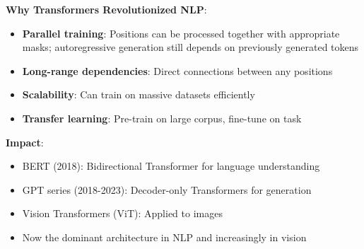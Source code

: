 \documentclass[11pt,twoside]{article}
\numberwithin{equation}{section}
\theoremstyle{plain}
\theoremstyle{definition}
\theoremstyle{remark}
\newenvironment{keyidea}{
  \begin{tcolorbox}[colback=yellow!5!white,
                    colframe=yellow!50!black,
                    title=Key Idea,
                    breakable,
                    enhanced,
                    sharp corners,
                    boxrule=0.8pt,
                    left=6pt, right=6pt, top=6pt, bottom=6pt]
}{
  \end{tcolorbox}
}
\begin{document}
\begin{keyidea}
\textbf{Why Transformers Revolutionized NLP}:
\begin{itemize}
\item \textbf{Parallel training}: Positions can be processed together with appropriate masks; autoregressive generation still depends on previously generated tokens
\item \textbf{Long-range dependencies}: Direct connections between any positions
\item \textbf{Scalability}: Can train on massive datasets efficiently
\item \textbf{Transfer learning}: Pre-train on large corpus, fine-tune on task
\end{itemize}

\textbf{Impact}:
\begin{itemize}
\item BERT (2018): Bidirectional Transformer for language understanding
\item GPT series (2018-2023): Decoder-only Transformers for generation
\item Vision Transformers (ViT): Applied to images
\item Now the dominant architecture in NLP and increasingly in vision
\end{itemize}
\end{keyidea}
\end{document}
